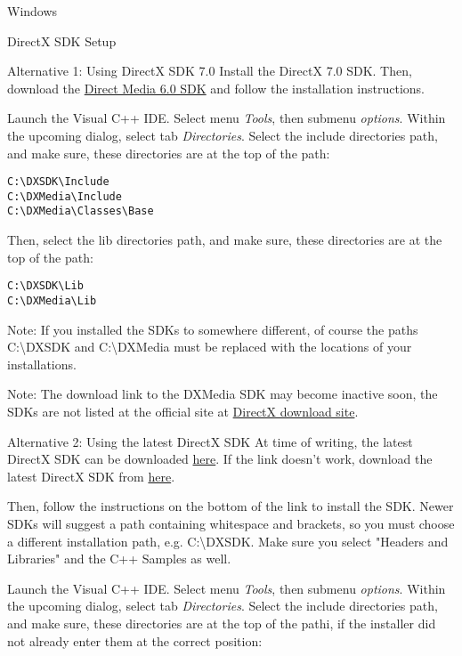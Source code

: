\begin{section}{Windows}
\begin{subsection}{DirectX SDK Setup}
\begin{subsubsection}{Alternative 1: Using DirectX SDK 7.0}
Install the DirectX 7.0 SDK. Then, download the \href{http://www.microsoft.com/downloads/details.aspx?FamilyId=FD044A42-9912-42A3-9A9E-D857199F888E&displaylang=en}{Direct Media 6.0 SDK} and follow the installation instructions.

Launch the Visual C++ IDE. Select menu \textit{Tools}, then submenu \textit{options}. Within the upcoming dialog, select tab \textit{Directories}. Select the include directories path, and make sure, these directories are at the top of the path:
\begin{verbatim}
C:\DXSDK\Include
C:\DXMedia\Include
C:\DXMedia\Classes\Base
\end{verbatim}

Then, select the lib directories path, and make sure, these directories are at the top of the path:
\begin{verbatim}
C:\DXSDK\Lib
C:\DXMedia\Lib
\end{verbatim}

Note: If you installed the SDKs to somewhere different, of course the paths C:\textbackslash{}DXSDK and C:\textbackslash{}DXMedia must be replaced with the locations of your installations.

Note: The download link to the DXMedia SDK may become inactive soon, the SDKs are not listed at the official site at \href{http://www.microsoft.com/downloads/details.aspx?FamilyId=FD044A42-9912-42A3-9A9E-D857199F888E&displaylang=en}{DirectX download site}.
\end{subsubsection}%
\begin{subsubsection}{Alternative 2: Using the latest DirectX SDK}
At time of writing, the latest DirectX SDK can be downloaded \href{http://www.microsoft.com/downloads/details.aspx?FamilyId=FD044A42-9912-42A3-9A9E-D857199F888E\&displaylang=en}{here}. If the link doesn't work, download the latest DirectX SDK from \href{http://www.microsoft.com/downloads/details.aspx?FamilyId=FD044A42-9912-42A3-9A9E-D857199F888E&displaylang=en}{here}.

Then, follow the instructions on the bottom of the link to install the SDK. Newer SDKs will suggest a path containing whitespace and brackets, so you must choose a different installation path, e.g. C:\textbackslash{}DXSDK.
Make sure you select "Headers and Libraries" and the C++ Samples as well.

Launch the Visual C++ IDE. Select menu \textit{Tools}, then submenu \textit{options}. Within the upcoming dialog, select tab \textit{Directories}. Select the include directories path, and make sure, these directories are at the top of the pathi, if the installer did not already enter them at the correct position:


\end{subsubsection}
\end{subsection}
\end{section}
